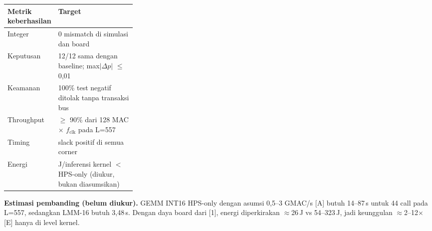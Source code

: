 \documentclass[9pt]{extarticle}
\newcommand{\hd}[1]{\cellcolor{thbg}\textbf{#1}}
\begin{document}
{\scriptsize
\begin{tabularx}{\linewidth}{|p{0.3\linewidth}|L|}
\hline
\hd{Metrik keberhasilan} & \hd{Target} \\ \hline
Integer & 0 mismatch di simulasi dan board \\ \hline
Keputusan & 12/12 sama dengan baseline; max$|\Delta p|$ $\le$ 0,01 \\ \hline
Keamanan & 100\% test negatif ditolak tanpa transaksi bus \\ \hline
Throughput & $\ge$ 90\% dari 128 MAC $\times$ $f_\mathrm{clk}$ pada L=557 \\ \hline
Timing & slack positif di semua corner \\ \hline
Energi & J/inferensi kernel $<$ HPS-only (diukur, bukan diasumsikan) \\ \hline
\end{tabularx}

\textbf{Estimasi pembanding (belum diukur).} GEMM INT16 HPS-only dengan asumsi 0,5--3 GMAC/s [A] butuh 14--87\,s untuk 44 call pada L=557, sedangkan LMM-16 butuh 3,48\,s. Dengan daya board dari [1], energi diperkirakan $\approx$26\,J vs 54--323\,J, jadi keunggulan $\approx$2--12$\times$ [E] hanya di level kernel.}

\end{document}
